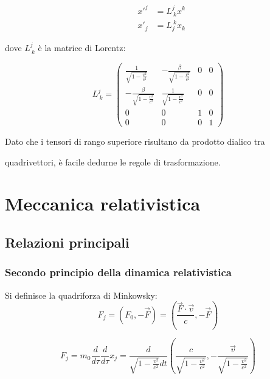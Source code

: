 \documentclass{article}
\begin{document}
\begin{equation}
    \begin{aligned}
        & x'^j &= L^j_{\ k}x^k \\
        & x'_j &= L_j^{\ k}x_k      
    \end{aligned}
\end{equation}

dove $L^j_{\ k}$ è la matrice di Lorentz:

\begin{equation}
    L^j_{\ k} = 
    \begin{pmatrix}
    \frac{1}{\sqrt{1-\frac{v^2}{c^2}}} & -\frac{\beta}{\sqrt{1-\frac{v^2}{c^2}}} & 0 & 0 \\
    -\frac{\beta}{\sqrt{1-\frac{v^2}{c^2}}} & \frac{1}{\sqrt{1-\frac{v^2}{c^2}}} & 0 & 0 \\
    0 & 0 & 1 & 0 \\
    0 & 0 & 0 & 1
    \end{pmatrix}
\end{equation}

Dato che i tensori di rango superiore risultano da prodotto dialico tra 

quadrivettori, è facile dedurne le regole di trasformazione.



\section{Meccanica relativistica}

\subsection{Relazioni principali}

\subsubsection{Secondo principio della dinamica relativistica}
Si definisce la quadriforza di Minkowsky:
\begin{equation}
    F_j =(F_0, -\vec{F})= (\frac{\vec{F}\cdot\vec{v}}{c}, -\vec{F})
\end{equation}

\begin{equation}
   F_j=m_0\frac{d}{d\tau}\frac{d}{d\tau}x_j=\frac{d}{\sqrt{1-\frac{v^2}{c^2}}dt}(\frac{c}{\sqrt{1-\frac{v^2}{c^2}}},-\frac{\vec{v}}{\sqrt{1-\frac{v^2}{c^2}}})
\end{equation}
\end{document}

